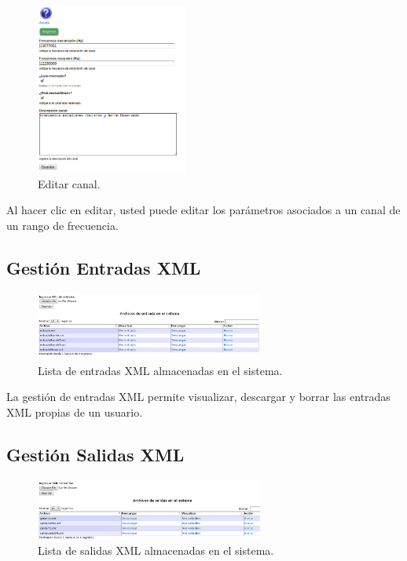 \begin{multicols}{2}
\begin{figure}[H]
	\centering
	\includegraphics[width=5cm]{Anexos/Imagenes/ManualUsuario/EditarCanal.png}
	\caption{ Editar canal.}
\end{figure}

Al hacer clic en editar, usted puede editar los parámetros asociados a un canal de un rango de frecuencia.

\subsection*{Gestión Entradas XML}

\begin{figure}[H]
	\centering
	\includegraphics[width=7.5cm]{Anexos/Imagenes/ManualUsuario/Entradas.png}
	\caption{ Lista de entradas XML almacenadas en el sistema.}
\end{figure}

La gestión de entradas XML permite visualizar, descargar y borrar las entradas XML propias de un usuario.

\subsection*{Gestión Salidas XML}

\begin{figure}[H]
	\centering
	\includegraphics[width=7.5cm]{Anexos/Imagenes/ManualUsuario/Salidas.png}
	\caption{ Lista de salidas XML almacenadas en el sistema.}
\end{figure}


\end{multicols}

